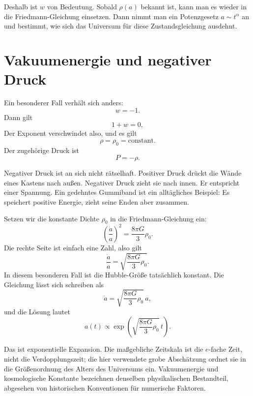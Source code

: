 Deshalb ist \(w\) von Bedeutung. Sobald \(\rho(a)\) bekannt ist, kann man es wieder in die Friedmann-Gleichung einsetzen. Dann nimmt man ein Potenzgesetz \(a\sim t^\alpha\) an und bestimmt, wie sich das Universum für diese Zustandsgleichung ausdehnt.

\section{Vakuumenergie und negativer Druck}

Ein besonderer Fall verhält sich anders:
\begin{equation}
w=-1.
\end{equation}
Dann gilt
\begin{equation}
1+w=0,
\end{equation}
Der Exponent verschwindet also, und es gilt
\begin{equation}
\rho=\rho_0=\text{constant}.
\end{equation}
Der zugehörige Druck ist
\begin{equation}
P=-\rho .
\end{equation}

Negativer Druck ist an sich nicht rätselhaft. Positiver Druck drückt die Wände eines Kastens nach außen. Negativer Druck zieht sie nach innen. Er entspricht einer Spannung. Ein gedehntes Gummiband ist ein alltägliches Beispiel: Es speichert positive Energie, zieht seine Enden aber zusammen.

Setzen wir die konstante Dichte \(\rho_0\) in die Friedmann-Gleichung ein:
\begin{equation}
\left(\frac{\dot a}{a}\right)^2=\frac{8\pi G}{3}\rho_0.
\end{equation}
Die rechte Seite ist einfach eine Zahl, also gilt
\begin{equation}
\frac{\dot a}{a}=\sqrt{\frac{8\pi G}{3}\rho_0}.
\end{equation}
In diesem besonderen Fall ist die Hubble-Größe tatsächlich konstant. Die Gleichung lässt sich schreiben als
\begin{equation}
\dot a=\sqrt{\frac{8\pi G}{3}\rho_0}\,a,
\end{equation}
und die Lösung lautet
\begin{equation}
a(t)\propto \exp\!\left(\sqrt{\frac{8\pi G}{3}\rho_0}\,t\right).
\end{equation}

Das ist exponentielle Expansion. Die maßgebliche Zeitskala ist die \(e\)-fache Zeit, nicht die Verdopplungszeit; die hier verwendete grobe Abschätzung ordnet sie in die Größenordnung des Alters des Universums ein. Vakuumenergie und kosmologische Konstante bezeichnen denselben physikalischen Bestandteil, abgesehen von historischen Konventionen für numerische Faktoren.


